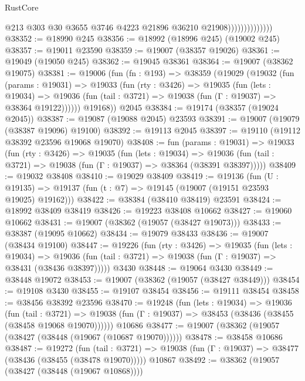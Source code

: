 \begin{lexlean}{RustCore}
\begin{coremodule}
                                @213
                                @303
                                @30
                                @3655
                                @3746
                                @4223
                                @21896
                                @36210
                                @21908))))))))))))))
@38352 := @18990 @245
@38356 := @18992 (@18996 @245) (@19002 @245)
@38357 := @19011 @23590
@38359 := @19007 (@38357 @19026)
@38361 := @19049 (@19050 @245)
@38362 := @19045 @38361
@38364 := @19007 (@38362 @19075)
@38381 := @19006
    (fun (fn : @193) =>
    @38359
      (@19029
        (@19032
          (fun (params : @19031) =>
          @19033
            (fun (rty : @3426) =>
            @19035
              (fun (lets : @19034) =>
              @19036 (fun (tail : @3721) => @19038 (fun (Γ : @19037) => @38364 @19122))))))
        @19168))
    @2045
@38384 := @19174 (@38357 (@19024 @2045))
@38387 := @19087 (@19088 @2045) @23593
@38391 := @19007 (@19079 (@38387 @19096) @19100)
@38392 := @19113 @2045
@38397 := @19110 (@19112 @38392 @23596 @19068 @19070)
@38408 := fun (params : @19031) =>
  @19033
    (fun (rty : @3426) =>
    @19035
      (fun (lets : @19034) =>
      @19036 (fun (tail : @3721) => @19038 (fun (Γ : @19037) => @38364 (@38391 @38397)))))
@38409 := @19032 @38408
@38410 := @19029 @38409
@38419 := @19136
    (fun (U : @19135) => @19137 (fun (t : @7) => @19145 (@19007 (@19151 @23593 @19025) @19162)))
@38422 := @38384 (@38410 @38419) @23591
@38424 := @18992 @38409 @38419
@38426 := @19223 @38408 @10662
@38427 := @19060 @10662
@38431 := @19007 (@38362 (@19057 (@38427 @19073)))
@38433 := @38387 (@19095 @10662)
@38434 := @19079 @38433
@38436 := @19007 (@38434 @19100)
@38447 := @19226
    (fun (rty : @3426) =>
    @19035
      (fun (lets : @19034) =>
      @19036 (fun (tail : @3721) => @19038 (fun (Γ : @19037) => @38431 (@38436 @38397)))))
    @3430
@38448 := @19064 @3430
@38449 := @38448 @19072
@38453 := @19007 (@38362 (@19057 (@38427 @38449)))
@38454 := @19108 @3430
@38455 := @19107 @38454
@38456 := @19111 @38454
@38458 := @38456 @38392 @23596
@38470 := @19248
    (fun (lets : @19034) =>
    @19036
      (fun (tail : @3721) =>
      @19038 (fun (Γ : @19037) => @38453 (@38436 (@38455 (@38458 @19068 @19070))))))
    @10686
@38477 := @19007 (@38362 (@19057 (@38427 (@38448 (@19067 (@10687 @19070))))))
@38478 := @38458 @10686
@38487 := @19272
    (fun (tail : @3721) => @19038 (fun (Γ : @19037) => @38477 (@38436 (@38455 (@38478 @19070)))))
    @10867
@38492 := @38362 (@19057 (@38427 (@38448 (@19067 @10868))))

\end{coremodule}
\end{lexlean}
